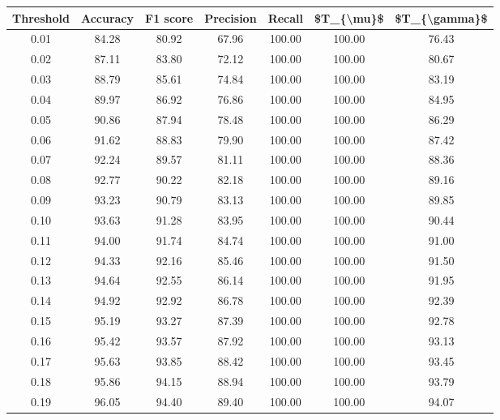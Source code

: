 \begin{tabular}{|c|c|c|c|c|c|c|}
\hline
 Threshold &  Accuracy &  F1 score &  Precision &  Recall &  \$T\_\{\textbackslash mu\}\$ &  \$T\_\{\textbackslash gamma\}\$ \\
\hline
      0.01 &     84.28 &     80.92 &      67.96 &  100.00 &     100.00 &         76.43 \\
      0.02 &     87.11 &     83.80 &      72.12 &  100.00 &     100.00 &         80.67 \\
      0.03 &     88.79 &     85.61 &      74.84 &  100.00 &     100.00 &         83.19 \\
      0.04 &     89.97 &     86.92 &      76.86 &  100.00 &     100.00 &         84.95 \\
      0.05 &     90.86 &     87.94 &      78.48 &  100.00 &     100.00 &         86.29 \\
      0.06 &     91.62 &     88.83 &      79.90 &  100.00 &     100.00 &         87.42 \\
      0.07 &     92.24 &     89.57 &      81.11 &  100.00 &     100.00 &         88.36 \\
      0.08 &     92.77 &     90.22 &      82.18 &  100.00 &     100.00 &         89.16 \\
      0.09 &     93.23 &     90.79 &      83.13 &  100.00 &     100.00 &         89.85 \\
      0.10 &     93.63 &     91.28 &      83.95 &  100.00 &     100.00 &         90.44 \\
      0.11 &     94.00 &     91.74 &      84.74 &  100.00 &     100.00 &         91.00 \\
      0.12 &     94.33 &     92.16 &      85.46 &  100.00 &     100.00 &         91.50 \\
      0.13 &     94.64 &     92.55 &      86.14 &  100.00 &     100.00 &         91.95 \\
      0.14 &     94.92 &     92.92 &      86.78 &  100.00 &     100.00 &         92.39 \\
      0.15 &     95.19 &     93.27 &      87.39 &  100.00 &     100.00 &         92.78 \\
      0.16 &     95.42 &     93.57 &      87.92 &  100.00 &     100.00 &         93.13 \\
      0.17 &     95.63 &     93.85 &      88.42 &  100.00 &     100.00 &         93.45 \\
      0.18 &     95.86 &     94.15 &      88.94 &  100.00 &     100.00 &         93.79 \\
      0.19 &     96.05 &     94.40 &      89.40 &  100.00 &     100.00 &         94.07 \\

\end{tabular}
